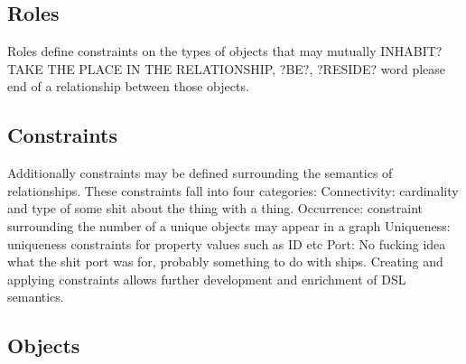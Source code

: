 \subsection{Roles}
 Roles define constraints on the types of objects that may mutually INHABIT? TAKE THE PLACE IN THE RELATIONSHIP, ?BE?, ?RESIDE? word please  end of a relationship between those objects. 


\subsection{Constraints}
 Additionally constraints may be defined surrounding the semantics of relationships. These constraints fall into four categories:
Connectivity: cardinality and type of some shit about the thing with a thing. 
Occurrence: constraint surrounding the number of a unique objects may appear in a graph
Uniqueness: uniqueness constraints for property values such as ID etc
Port: No fucking idea what the shit port was for, probably something to do with ships.
Creating and applying constraints allows further development and enrichment of DSL semantics.  
\subsection{Objects}


